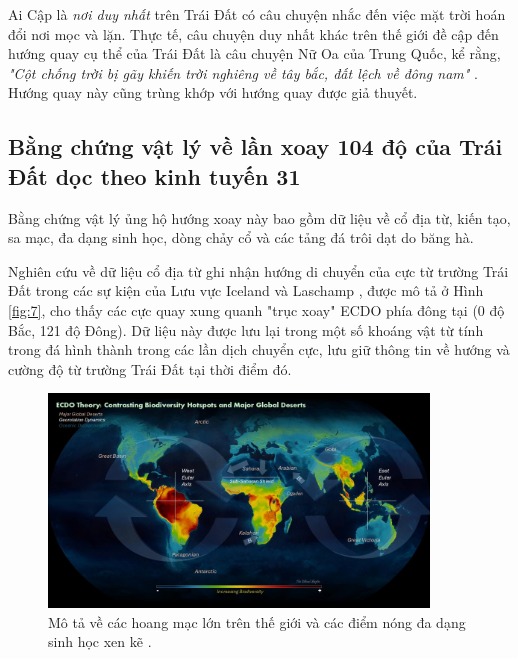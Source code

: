 \documentclass[10pt,twocolumn,letterpaper]{article}
\begin{document}
Ai Cập là \textit{nơi duy nhất} trên Trái Đất có câu chuyện nhắc đến việc mặt trời hoán đổi nơi mọc và lặn. Thực tế, câu chuyện duy nhất khác trên thế giới đề cập đến hướng quay cụ thể của Trái Đất là câu chuyện Nữ Oa của Trung Quốc, kể rằng, \textit{"Cột chống trời bị gãy khiến trời nghiêng về tây bắc, đất lệch về đông nam"} \cite{8}. Hướng quay này cũng trùng khớp với hướng quay được giả thuyết.

\subsection{Bằng chứng vật lý về lần xoay 104 độ của Trái Đất dọc theo kinh tuyến 31}

Bằng chứng vật lý ủng hộ hướng xoay này bao gồm dữ liệu về cổ địa từ, kiến tạo, sa mạc, đa dạng sinh học, dòng chảy cổ và các tảng đá trôi dạt do băng hà.

Nghiên cứu về dữ liệu cổ địa từ ghi nhận hướng di chuyển của cực từ trường Trái Đất trong các sự kiện của Lưu vực Iceland và Laschamp \cite{35}, được mô tả ở Hình \ref{fig:7}, cho thấy các cực quay xung quanh "trục xoay" ECDO phía đông tại (0 độ Bắc, 121 độ Đông). Dữ liệu này được lưu lại trong một số khoáng vật từ tính trong đá hình thành trong các lần dịch chuyển cực, lưu giữ thông tin về hướng và cường độ từ trường Trái Đất tại thời điểm đó.

\begin{figure}[t]
\begin{center}
\includegraphics[width=0.9\textwidth]{biodiversity.jpg}
\end{center}
   \caption{Mô tả về các hoang mạc lớn trên thế giới và các điểm nóng đa dạng sinh học xen kẽ \cite{28}.}
\label{fig:9}
\end{figure}
\end{document}
